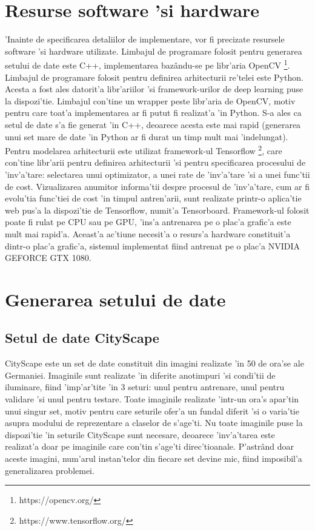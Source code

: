 \documentclass[12pt,a4paper,twoside]{report}
\begin{document}
\section{Resurse software 'si hardware}
'Inainte de specificarea detaliilor de implementare, vor fi precizate resursele software 'si hardware utilizate. Limbajul de programare folosit pentru generarea setului de date este C++, implementarea baz\^andu-se pe libr'aria OpenCV \footnote{https://opencv.org/
}. Limbajul de programare folosit pentru definirea arhitecturii re'telei este Python. Acesta a fost ales datorit'a libr'ariilor 'si framework-urilor de deep learning puse la dispozi'tie. Limbajul con'tine un wrapper peste libr'aria de OpenCV, motiv pentru care toat'a implementarea ar fi putut fi realizat'a 'in Python. S-a ales ca setul de date s'a fie generat 'in C++, deoarece acesta este mai rapid (generarea unui set mare de date 'in Python ar fi durat un timp mult mai 'indelungat). Pentru modelarea arhitecturii este utilizat framework-ul Tensorflow \footnote{https://www.tensorflow.org/
}, care con'tine libr'arii pentru definirea arhitecturii 'si pentru specificarea procesului de 'inv'a'tare: selectarea unui optimizator, a unei rate de 'inv'a'tare 'si a unei func'tii de cost. Vizualizarea anumitor informa'tii despre procesul de 'inv'a'tare, cum ar fi evolu'tia func'tiei de cost 'in timpul antren'arii, sunt realizate printr-o aplica'tie web pus'a la dispozi'tie de Tensorflow, numit'a Tensorboard. Framework-ul folosit poate fi rulat pe CPU sau pe GPU, 'ins'a antrenarea pe o plac'a grafic'a este mult mai rapid'a. Aceast'a ac'tiune necesit'a o resurs'a hardware constituit'a dintr-o plac'a grafic'a, sistemul implementat fiind antrenat pe o plac'a NVIDIA GEFORCE GTX 1080.

\section{Generarea setului de date}
\subsection{Setul de date CityScape}
CityScape este un set de date constituit din imagini realizate 'in 50 de ora'se ale Germaniei. Imaginile sunt realizate 'in diferite anotimpuri 'si condi'tii de iluminare, fiind 'imp'ar'tite 'in 3 seturi: unul pentru antrenare, unul pentru validare 'si unul pentru testare. Toate imaginile realizate 'intr-un ora's apar'tin unui singur set, motiv pentru care seturile ofer'a un fundal diferit 'si o varia'tie asupra modului de reprezentare a claselor de s'age'ti. Nu toate imaginile puse la dispozi'tie 'in seturile CityScape sunt necesare, deoarece 'inv'a'tarea este realizat'a doar pe imaginile care con'tin s'age'ti direc'tioanale. P'astr\^and doar aceste imagini, num'arul instan'telor din fiecare set devine mic, fiind imposibil'a generalizarea problemei.
\end{document}
